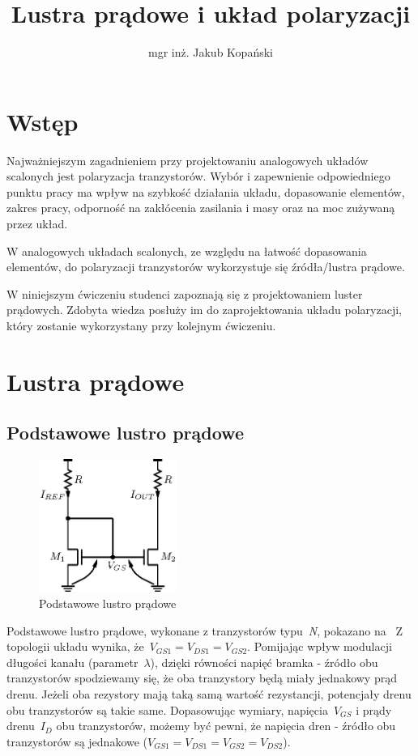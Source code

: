 \documentclass[twoside,pl,final]{labman}
\title{Lustra prądowe i układ polaryzacji}
\author{mgr inż. Jakub Kopański}
\begin{document}
\maketitle
\tableofcontents
\clearpage
\listoffigures
\clearpage
\listoftables
\clearpage

\chapter{Wstęp}
\label{intro}
Najważniejszym zagadnieniem przy projektowaniu
analogowych układów scalonych jest polaryzacja tranzystorów.
Wybór i zapewnienie odpowiedniego punktu pracy
ma wpływ na szybkość działania układu,
dopasowanie elementów, zakres pracy,
odporność na zakłócenia zasilania i masy
oraz na moc zużywaną przez układ.

W analogowych układach scalonych,
ze względu na łatwość dopasowania elementów,
do polaryzacji tranzystorów wykorzystuje się źródła/lustra prądowe.

W niniejszym ćwiczeniu studenci zapoznają się
z projektowaniem luster prądowych.
Zdobyta wiedza posłuży im do zaprojektowania układu polaryzacji,
który zostanie wykorzystany przy kolejnym ćwiczeniu.

\chapter{Lustra prądowe}
\label{mirror}

\section{Podstawowe lustro prądowe}
\label{mirror:basic}
\begin{figure}[!htbp]
  \centering
  \includegraphics[width=0.4\textwidth]{basic}
  \caption{Podstawowe lustro prądowe}
  \label{fig:basic}
\end{figure}

Podstawowe lustro prądowe,
wykonane z tranzystorów typu~\emph{N},
pokazano na~
Z topologii układu wynika, że~$V_{GS1} = V_{DS1} = V_{GS2}$.
Pomijając wpływ modulacji długości kanału (parametr~$\lambda$),
dzięki równości napięć bramka - źródło obu tranzystorów spodziewamy się,
że oba tranzystory będą miały jednakowy prąd drenu.
Jeżeli oba rezystory mają taką samą wartość rezystancji,
potencjały drenu obu tranzystorów są takie same.
Dopasowując wymiary, napięcia~$V_{GS}$ i prądy drenu~$I_D$ obu tranzystorów,
możemy być pewni, że napięcia dren - źródło obu tranzystorów są jednakowe
($V_{GS1} = V_{DS1} = V_{GS2} = V_{DS2}$).
\end{document}
